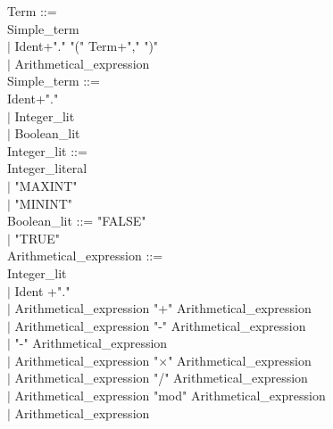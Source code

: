 \documentclass[12pt,a4paper,draft]{report}
\begin{document}
{\begin{sloppypar}
   
\noindent Term  ::= \\
   Simple\_term\\
\hspace*{0.20in} $|$ Ident+"." "(" Term+"," ")"  \\
\hspace*{0.20in} $|$  Arithmetical\_expression\\
Simple\_term ::= \\
  Ident+"."\\
\hspace*{0.20in} $|$  Integer\_lit\\
\hspace*{0.20in} $|$  Boolean\_lit\\
Integer\_lit ::= \\
  Integer\_literal \\
\hspace*{0.20in} $|$ "MAXINT"\\
\hspace*{0.20in} $|$ "MININT" \\
Boolean\_lit ::= "FALSE"\\
\hspace*{0.20in} $|$ "TRUE" \\
Arithmetical\_expression ::= \\
\hspace*{0.20in}   Integer\_lit\\
\hspace*{0.20in} $|$  Ident +"."\\
\hspace*{0.20in} $|$  Arithmetical\_expression  "+"  Arithmetical\_expression\\
\hspace*{0.20in} $|$  Arithmetical\_expression  "-"  Arithmetical\_expression\\
\hspace*{0.20in} $|$ "-" Arithmetical\_expression \\
\hspace*{0.20in} $|$  Arithmetical\_expression  "$\times$"  Arithmetical\_expression\\
\hspace*{0.20in} $|$  Arithmetical\_expression  "/"  Arithmetical\_expression\\
\hspace*{0.20in} $|$  Arithmetical\_expression  "mod"  Arithmetical\_expression\\
\hspace*{0.20in} $|$  Arithmetical\_expression  \\

\end{sloppypar}}
\end{document}
